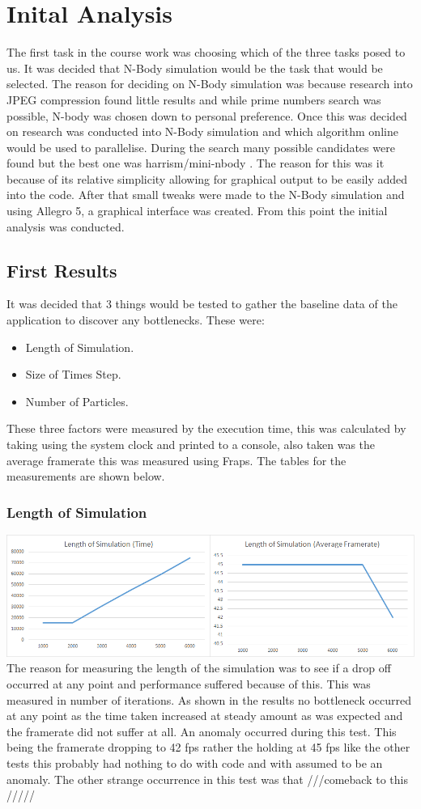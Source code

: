 \documentclass[12pt]{article}
\begin{document}
\section{Inital Analysis}
The first task in the course work was choosing which of the three tasks posed to us. It was decided that N-Body simulation would be the task that would be selected. The reason for deciding on N-Body simulation was because research into JPEG compression found little results and while prime numbers search was possible, N-body was chosen down to personal preference.
\newline 
Once this was decided on research was conducted into N-Body simulation and which algorithm online would be used to parallelise. During the search many possible candidates were found but the best one was harrism/mini-nbody . The reason for this was it because of its relative simplicity allowing for graphical output to be easily added into the code. After that small tweaks were made to the N-Body simulation and using Allegro 5, a graphical interface was created. From this point the initial analysis was conducted.
\subsection{First Results}
It was decided that 3 things would be tested to gather the baseline data of the application to discover any bottlenecks. These were:
\begin{itemize}
 \item Length of Simulation.
 \item Size of Times Step.
  \item Number of Particles. 
\end{itemize}
These three factors were measured by the execution time, this was calculated by taking using the system clock and printed to a console, also taken was the average framerate this was measured using Fraps. The tables for the measurements are shown below.
\subsubsection{Length of Simulation}

\includegraphics[scale=0.5]{pics/ialength.png}
\newline
The reason for measuring the length of the simulation was to see if a drop off occurred at any point and performance suffered because of this. This was measured in number of iterations. As shown in the results no bottleneck occurred at any point as the time taken increased at steady amount as was expected and the framerate did not suffer at all. An anomaly occurred during this test. This being the framerate dropping to 42 fps rather the holding at 45 fps like the other tests this probably had nothing to do with code and with assumed to be an anomaly. The other strange occurrence in this test was that ///comeback to this /////
\end{document}
